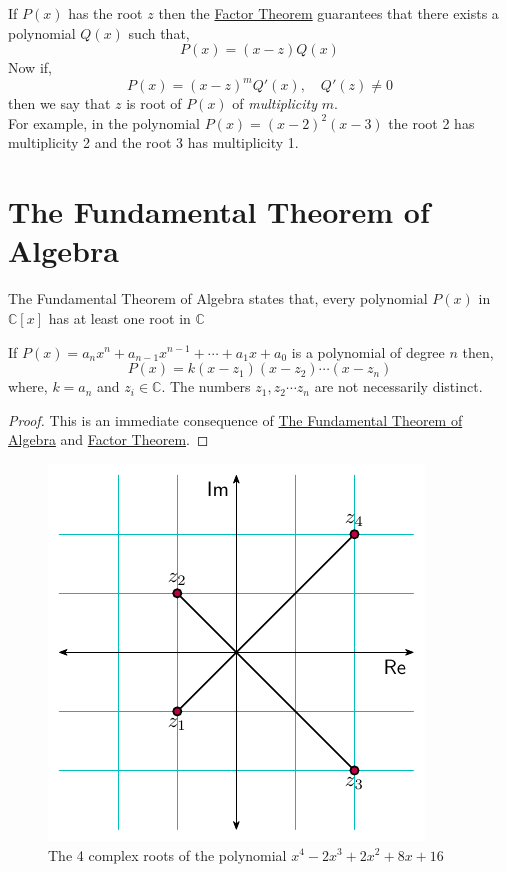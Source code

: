 If $P(x)$ has the root $z$ then the \hyperref[thm:factor-theorem]{Factor Theorem} guarantees that there exists a polynomial 
$Q(x)$ such that,
\[
    P(x) = \left(x - z\right)Q(x)
\]
Now if,
\[
    P(x) = \left(x-z\right)^{m}Q'(x), \quad Q'(z) \neq 0
\]
then we say that $z$ is root of $P(x)$ of \textit{multiplicity} $m$. \\
For example, in the polynomial $P(x)=\left(x-2\right)^{2}\left(x-3\right)$ 
the root 2 has multiplicity 2 and the root 3 has multiplicity 1.

\section{The Fundamental Theorem of Algebra}

\begin{theorem}\label{thm:fta}
    The Fundamental Theorem of Algebra states that, every polynomial $P(x)$ in $\mathbb{C}[x]$ has at least 
    one root in $\mathbb{C}$
\end{theorem}
\begin{corollary}
    If $P(x) = a_{n}x^{n} + a_{n-1}x^{n-1} + \cdots + a_{1}x + a_{0}$ is a polynomial of degree $n$ then,
    \[
        P(x) = k(x - z_{1})(x - z_{2})\cdots (x - z_{n})
    \]
    where, $k = a_{n}$ and $z_{i} \in \mathbb{C}$. The numbers $z_{1},z_{2}\cdots z_{n}$ are not necessarily 
    distinct.
\end{corollary}
\begin{proof}
    This is an immediate consequence of \hyperref[thm:fta]{The Fundamental Theorem of Algebra} 
    and \hyperref[thm:factor-theorem]{Factor Theorem}.
\end{proof}

\begin{figure}[H]
\centering
\includegraphics[scale=1]{polynomials/figures/cplane_roots.pdf}
\caption{The 4 complex roots of the polynomial $x^{4} - 2 x^{3} + 2 x^{2} + 8 x + 16$ }
\label{fig:cplane_roots}
\end{figure}

